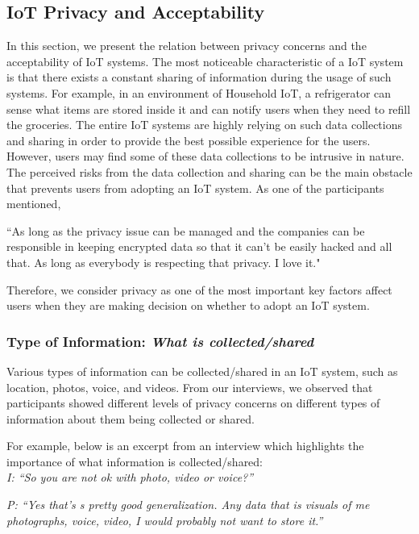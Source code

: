 \subsection{IoT Privacy and Acceptability}
In this section, we present the relation between privacy concerns and the acceptability of IoT systems. The most noticeable characteristic of a IoT system is that there exists a constant sharing of information during the usage of such systems. For example, in an environment of Household IoT, a refrigerator can sense what items are stored inside it and can notify users when they need to refill the groceries. The entire IoT systems are highly relying on such data collections and sharing in order to provide the best possible experience for the users. However, users may find some of these data collections to be intrusive in nature. The perceived risks from the data collection and sharing can be the main obstacle that prevents users from adopting an IoT system. As one of the participants mentioned, 

``As long as the privacy issue can be managed and the companies can be responsible in keeping encrypted data so that it can't be easily hacked and all that. As long as everybody is respecting that privacy. I love it." 

Therefore, we consider privacy as one of the most important key factors affect users when they are making decision on whether to adopt an IoT system.

\subsubsection{Type of Information: \textit{What is collected/shared}}
Various types of information can be collected/shared in an IoT system, such as location, photos, voice, and videos. From our interviews, we observed that participants showed different levels of privacy concerns on different types of information about them being collected or shared. 

For example,
below is an excerpt from an interview which highlights the importance of what information is collected/shared:\\

\textit{I: ``So you are not ok with photo, video or voice?''\\}

\textit{P: ``Yes that's s pretty good generalization. Any data that is visuals of me photographs, voice, video, I would probably not want to store it.''\\}


